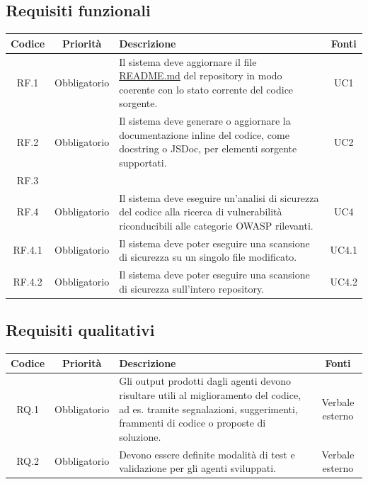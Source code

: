 \documentclass[12pt, a4paper]{article}
\begin{document}
\subsection{Requisiti funzionali}\label{requisiti-funzionali}

\begin{table}[ht]
    \centering
    \renewcommand{\arraystretch}{1.3}
    \begin{tabularx}{\textwidth}{|c|c|X|c|}
        \hline
        \textbf{Codice} & \textbf{Priorità} & \textbf{Descrizione} & \textbf{Fonti} \\ \hline
        RF.1 & Obbligatorio & Il sistema deve aggiornare il file \href{http://readme.md}{README.md} 
        del repository in modo coerente con lo stato corrente del codice sorgente. & UC1 \\ \hline
        RF.2 & Obbligatorio & Il sistema deve generare o aggiornare la documentazione inline del
        codice, come docstring o JSDoc, per elementi sorgente supportati. & UC2 \\ \hline
        RF.3 & & & \\ \hline
        RF.4 & Obbligatorio & Il sistema deve eseguire un'analisi di sicurezza del codice alla ricerca
        di vulnerabilità riconducibili alle categorie OWASP rilevanti. & UC4 \\ \hline
        RF.4.1 & Obbligatorio & Il sistema deve poter eseguire una scansione di sicurezza su un singolo
        file modificato. & UC4.1 \\ \hline
        RF.4.2 & Obbligatorio & Il sistema deve poter eseguire una scansione di sicurezza sull'intero
        repository. & UC4.2 \\ \hline
    \end{tabularx}
\end{table}

\subsection{Requisiti qualitativi}\label{requisiti-qualitativi}

\begin{table}[ht]
    \centering
    \renewcommand{\arraystretch}{1.3}
    \begin{tabularx}{\textwidth}{|c|c|X|c|}
        \hline
        \textbf{Codice} & \textbf{Priorità} & \textbf{Descrizione} & \textbf{Fonti} \\ \hline
        RQ.1 & Obbligatorio & Gli output prodotti dagli agenti devono risultare utili al miglioramento
        del codice, ad es. tramite segnalazioni, suggerimenti, frammenti di codice o proposte di soluzione. &
        Verbale esterno \\ \hline
        RQ.2 & Obbligatorio & Devono essere definite modalità di test e validazione per gli agenti sviluppati. & 
        Verbale esterno \\ \hline
    \end{tabularx}
\end{table}
\end{document}
